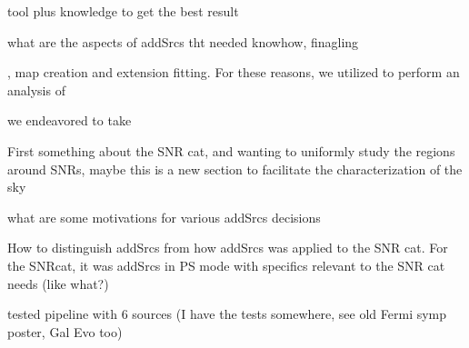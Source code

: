 tool plus knowledge to get the best result

what are the aspects of addSrcs tht needed knowhow, finagling

, \ts{} map creation and extension fitting.
  For these reasons, we utilized \ptlike{} to perform an analysis of 

we endeavored to take 

First something about the SNR cat, and wanting to uniformly study the regions around SNRs, maybe this is a new section
to facilitate the characterization of the sky

what are some motivations for various addSrcs decisions 

How to distinguish addSrcs from how addSrcs was applied to the SNR cat. For the SNRcat, it was addSrcs in PS mode with specifics relevant to the SNR cat needs (like what?)


tested pipeline with 6 sources (I have the tests somewhere, see old Fermi symp poster, Gal Evo too)